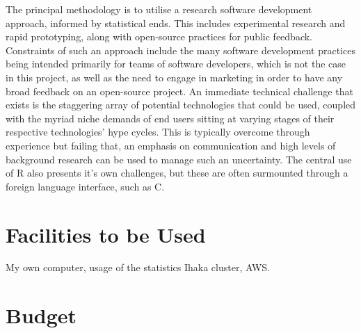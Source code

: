 \documentclass[a4paper,10pt]{article}
\begin{document}
The principal methodology is to utilise a research software development
approach, informed by statistical ends.
This includes experimental research and rapid prototyping, along with
open-source practices for public feedback.
Constraints of such an approach include the many software development practices
being intended primarily for teams of software developers, which is not the
case in this project, as well as the need to engage in marketing in order to
have any broad feedback on an open-source project.
An immediate technical challenge that exists is the staggering array of
potential technologies that could be used, coupled with the myriad niche
demands of end users sitting at varying stages of their respective
technologies' hype cycles.
This is typically overcome through experience but failing that, an emphasis on
communication and high levels of background research can be used to manage such
an uncertainty.
The central use of R also presents it's own challenges, but these are often
surmounted through a foreign language interface, such as C.

\section{Facilities to be Used}

My own computer, usage of the statistics Ihaka cluster, AWS.

\section{Budget}
\end{document}
